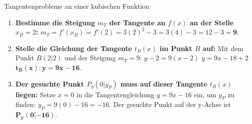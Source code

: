 \begin{loesungsumgebung}{Tangentenprobleme an einer kubischen Funktion}
\begin{enumerate}[label=(\alph*)]
\begin{enumerate}[label=\arabic*.]
        \item \textbf{Bestimme die Steigung $m_T$ der Tangente an $f(x)$ an der Stelle $x_B=2$:}
        $m_T = f'(x_B) = f'(2) = 3(2)^2 - 3 = 3(4) - 3 = 12 - 3 = \mathbf{9}$.

        \item \textbf{Stelle die Gleichung der Tangente $t_B(x)$ im Punkt $B$ auf:}
        Mit dem Punkt $B(2|2)$ und der Steigung $m_T=9$:
        $y - 2 = 9(x - 2)$
        $y = 9x - 18 + 2$
        $\mathbf{t_B(x): y = 9x - 16}$.

        \item \textbf{Der gesuchte Punkt $P_y(0|y_P)$ muss auf dieser Tangente $t_B(x)$ liegen:}
        Setze $x=0$ in die Tangentengleichung $y = 9x - 16$ ein, um $y_P$ zu finden:
        $y_P = 9(0) - 16 = -16$.
        Der gesuchte Punkt auf der y-Achse ist $\mathbf{P_y(0|-16)}$.
    \end{enumerate}
\end{enumerate}

\end{loesungsumgebung}


